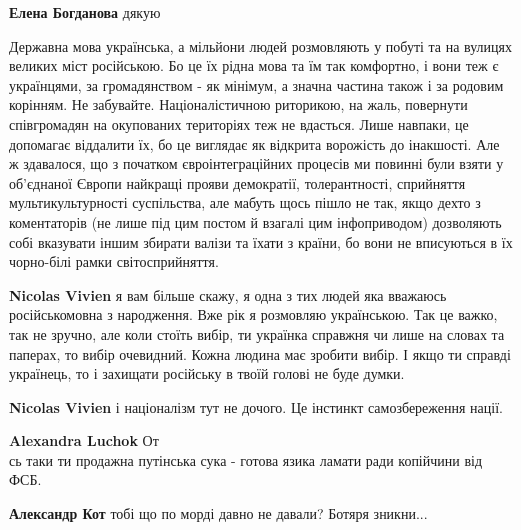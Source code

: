 \begin{itemize}
\begin{itemize}
\textbf{Елена Богданова} дякую



Державна мова українська, а мільйони людей розмовляють у побуті та на вулицях
великих міст російською. Бо це їх рідна мова та їм так комфортно, і вони теж є
українцями, за громадянством - як мінімум, а значна частина також і за родовим
корінням. Не забувайте. Націоналістичною риторикою, на жаль, повернути
співгромадян на окупованих територіях теж не вдасться. Лише навпаки, це
допомагає віддалити їх, бо це виглядає як відкрита ворожість до інакшості. Але
ж здавалося, що з початком євроінтеграційних процесів ми повинні були взяти у
об'єднаної Європи найкращі прояви демократії, толерантності, сприйняття
мультикультурності суспільства, але мабуть щось пішло не так, якщо дехто з
коментаторів (не лише під цим постом й взагалі цим інфоприводом) дозволяють
собі вказувати іншим збирати валізи та їхати з країни, бо вони не вписуються в
їх чорно-білі рамки світосприйняття.



\textbf{Nicolas Vivien} я вам більше скажу, я одна з тих людей яка вважаюсь
російськомовна з народження. Вже рік я розмовляю українською. Так це важко, так
не зручно, але коли стоїть вибір, ти українка справжня чи лише на словах та
паперах, то вибір очевидний. Кожна людина має зробити вибір. І якщо ти справді
українець, то і захищати російську в твоїй голові не буде думки.


\textbf{Nicolas Vivien} і націоналізм тут не дочого. Це інстинкт самозбереження нації.


\textbf{Alexandra Luchok} От\\сь таки ти продажна путінська сука - готова язика ламати ради копійчини від ФСБ.


\textbf{Александр Кот} тобі що по морді давно не давали? Ботяря зникни...


\end{itemize}
\end{itemize}
